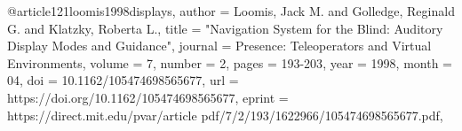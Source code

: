 @article{121loomis1998displays,
author = {Loomis, Jack M. and Golledge, Reginald G. and Klatzky, Roberta L.},
title = "{Navigation System for the Blind: Auditory Display Modes and Guidance}",
journal = {Presence: Teleoperators and Virtual Environments},
volume = {7},
number = {2},
pages = {193-203},
year = {1998},
month = {04},
doi = {10.1162/105474698565677},
url = {https://doi.org/10.1162/105474698565677},
eprint = {https://direct.mit.edu/pvar/article pdf/7/2/193/1622966/105474698565677.pdf},
}